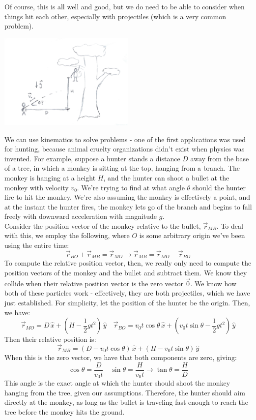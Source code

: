 Of course, this is all well and good, but we do need to be able to consider when things hit each other, especially with projectiles (which is a very common problem). \\
\begin{center}
	\includegraphics[width=0.5\textwidth]{images/mechintro/projectile_motion.png}\\
\end{center}
We can use kinematics to solve problems - one of the first applications was used for hunting, because animal cruelty organizations didn't exist when physics was invented. For example, suppose a hunter stands a distance $D$ away from the base of a tree, in which a monkey is sitting at the top, hanging from a branch. The monkey is hanging at a height $H$, and the hunter can shoot a bullet at the monkey with velocity $v_0$. We're trying to find at what angle $\theta$ should the hunter fire to hit the monkey. We're also assuming the monkey is effectively a point, and at the instant the hunter fires, the monkey lets go of the branch and begins to fall freely with downward acceleration with magnitude $g$.\\
Consider the position vector of the monkey relative to the bullet, $\vec r_{MB}$. To deal with this, we employ the following, where $O$ is some arbitrary origin we've been using the entire time:
\[
	\vec r_{BO} + \vec r_{MB} = \vec r_{MO} \rightarrow \vec r_{MB} = \vec r_{MO} - \vec r_{BO} 
\]
To compute the relative position vector, then, we really only need to 
compute the position vectors of the monkey and the bullet and subtract them. We know they collide when their relative position vector is the zero vector $\vec 0$.  We know how both of these particles work - effectively, they are both projectiles, which we have just established. For simplicity, let the position of the hunter be the origin. Then, we have: 
\[
	\vec r_{MO} = D\, \hat x + \left(H - \frac{1}{2}gt^2 \right)\, \hat y \quad \vec r_{BO} = v_0t\cos\theta \, \hat x + \left(v_0t\sin\theta - \frac{1}{2} gt^2 \right) \, \hat y
\]
Then their relative position is: 
\[
	\vec r_{MB} = (D - v_0t\cos\theta) \, \hat x + (H - v_0t\sin\theta) \, \hat y
\]
When this is the zero vector, we have that both components are zero, giving:
\[
	\cos \theta = \frac{D}{v_0t} \quad \sin \theta = \frac{H}{v_0t} \rightarrow \tan \theta = \frac{H}{D}
\]
This angle is the exact angle at which the hunter should shoot the monkey hanging from the tree, given our assumptions. Therefore, the hunter should aim directly at the monkey, as long as the bullet is traveling fast enough to reach the tree before the monkey hits the ground. 

